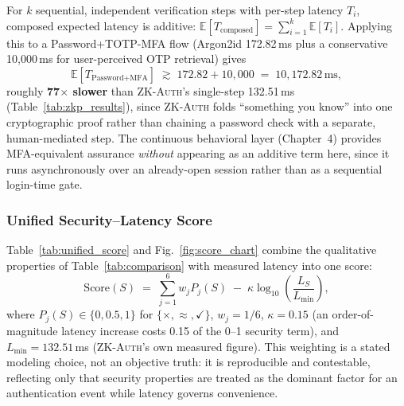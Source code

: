 \documentclass[12pt,a4paper,oneside]{report}
\begin{document}
For $k$ sequential, independent verification steps with per-step
latency $T_i$, composed expected latency is additive:
$\mathbb{E}[T_{\text{composed}}] = \sum_{i=1}^{k} \mathbb{E}[T_i]$.
Applying this to a Password+TOTP-MFA flow (Argon2id 172.82\,ms plus a
conservative 10{,}000\,ms for user-perceived OTP retrieval) gives
\begin{equation}
\mathbb{E}[T_{\text{Password+MFA}}] \;\gtrsim\; 172.82 + 10{,}000
\;=\; 10{,}172.82\,\text{ms},
\label{eq:mfa_composed}
\end{equation}
roughly \textbf{77$\times$ slower} than \textsc{ZK-Auth}'s single-step
132.51\,ms (Table~\ref{tab:zkp_results}), since \textsc{ZK-Auth} folds
``something you know'' into one cryptographic proof rather than
chaining a password check with a separate, human-mediated step.
The continuous behavioral layer (Chapter~4) provides MFA-equivalent
assurance \emph{without} appearing as an additive term here, since it
runs asynchronously over an already-open session rather than as a
sequential login-time gate.

\subsubsection{Unified Security--Latency Score}

Table~\ref{tab:unified_score} and Fig.~\ref{fig:score_chart} combine
the qualitative properties of Table~\ref{tab:comparison} with measured
latency into one score:
\begin{equation}
\mathrm{Score}(S) \;=\; \sum_{j=1}^{6} w_j P_j(S)
\;-\; \kappa \log_{10}\!\left(\frac{L_S}{L_{\min}}\right),
\label{eq:unified_score}
\end{equation}
where $P_j(S) \in \{0, 0.5, 1\}$ for $\{\times, \approx, \checkmark\}$,
$w_j=1/6$, $\kappa=0.15$ (an order-of-magnitude latency increase costs
0.15 of the 0--1 security term), and $L_{\min}=132.51$\,ms
(\textsc{ZK-Auth}'s own measured figure). This weighting is a stated
modeling choice, not an objective truth: it is reproducible and
contestable, reflecting only that security properties are treated as
the dominant factor for an authentication event while latency governs
convenience.
\end{document}
